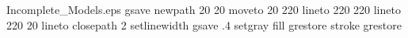 %
%
%
%
%
\begin{filecontents*}{Incomplete_Models.eps}
gsave
newpath
  20 20 moveto
  20 220 lineto
  220 220 lineto
  220 20 lineto
closepath
2 setlinewidth
gsave
  .4 setgray fill
grestore
stroke
grestore
\end{filecontents*}
%
\RequirePackage{fix-cm}
%
\documentclass[smallextended]{svjour3}       %
%
\smartqed  %
%
\usepackage{graphicx}
\usepackage{csquotes}
\usepackage{amsfonts,amssymb}
\usepackage{enumerate}
\usepackage{commath}
\usepackage{bm}
\usepackage{chngcntr}
\usepackage{apptools}

\newcommand{\Comment}[1]{}

\newcommand{\Nats}{\mathbb{N}}
\newcommand{\Ints}{\mathbb{Z}}
\newcommand{\Rats}{\mathbb{Q}}
\newcommand{\Reals}{\mathbb{R}}
\newcommand{\Coms}{\mathbb{C}}

\newcommand{\A}[1]{\lvert #1 \rvert}
\newcommand{\N}[1]{\lVert #1 \rVert}

\newcommand{\Argmin}[1]{\underset{#1}{\operatorname{arg\,min}}\,}
\newcommand{\Argmax}[1]{\underset{#1}{\operatorname{arg\,max}}\,}

\newcommand{\I}{\operatorname{id}}
\newcommand{\D}{\operatorname{diag}}

\newcommand{\Sq}[2]{\{#1\}_{#2 \in \Nats}}
\newcommand{\Sqn}[1]{\Sq{#1}{n}}

